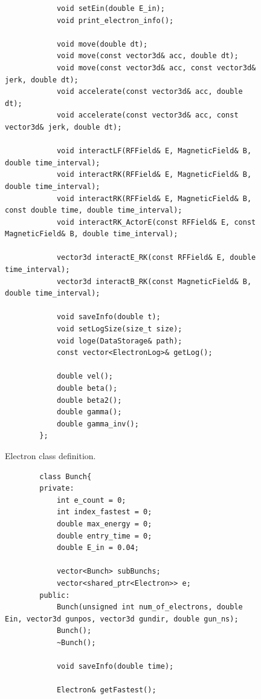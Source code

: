 \documentclass[a4paper,oneside,12pt]{report}
\numberwithin{equation}{chapter}
\begin{document}
{\begin{figure}[H]
\begin{verbatim}
            void setEin(double E_in);
            void print_electron_info();

            void move(double dt);
            void move(const vector3d& acc, double dt);
            void move(const vector3d& acc, const vector3d& jerk, double dt);
            void accelerate(const vector3d& acc, double dt);
            void accelerate(const vector3d& acc, const vector3d& jerk, double dt);
            
            void interactLF(RFField& E, MagneticField& B, double time_interval);
            void interactRK(RFField& E, MagneticField& B, double time_interval);
            void interactRK(RFField& E, MagneticField& B, const double time, double time_interval);
            void interactRK_ActorE(const RFField& E, const MagneticField& B, double time_interval);

            vector3d interactE_RK(const RFField& E, double time_interval);
            vector3d interactB_RK(const MagneticField& B, double time_interval);

            void saveInfo(double t);
            void setLogSize(size_t size);
            void loge(DataStorage& path);
            const vector<ElectronLog>& getLog();

            double vel();
            double beta();
            double beta2();
            double gamma();
            double gamma_inv();
        };
    \end{verbatim}
    \vspace{0pt}
    \caption{Electron class definition.}
    \label{fig:e_class}
\end{figure}

\begin{figure}[H]
    \centering
    \begin{verbatim}
        class Bunch{
        private:
            int e_count = 0;
            int index_fastest = 0;
            double max_energy = 0;
            double entry_time = 0;
            double E_in = 0.04;

            vector<Bunch> subBunchs;
            vector<shared_ptr<Electron>> e;
        public:
            Bunch(unsigned int num_of_electrons, double Ein, vector3d gunpos, vector3d gundir, double gun_ns);
            Bunch();
            ~Bunch();

            void saveInfo(double time);

            Electron& getFastest();


\end{verbatim}
\end{figure}}
\end{document}
